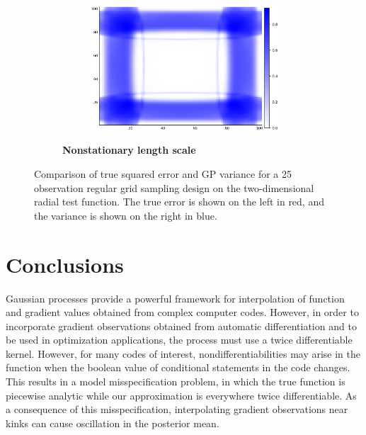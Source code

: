 \documentclass{article}
\begin{document}
\begin{figure}
\begin{subfigure}[b]{.5\textwidth}
\begin{subfigure}[b]{.5\textwidth}
        \includegraphics[scale=0.27]{figures/heatmaps/variance-length-25.png}
      \end{subfigure}
      \caption{\textbf{Nonstationary length scale}}
    \end{subfigure}
		\caption{Comparison of true squared error and GP variance for a 25 observation regular grid sampling design on the two-dimensional radial test function. The true error is shown on the left in red, and the variance is shown on the right in blue.}
		\label{variance}
\end{figure}

\section{Conclusions}
Gaussian processes provide a powerful framework for interpolation of function and gradient values obtained from complex computer codes. However, in order to incorporate gradient observations obtained from automatic differentiation and to be used in optimization applications, the process must use a twice differentiable kernel. However, for many codes of interest, nondifferentiabilities may arise in the function when the boolean value of conditional statements in the code changes. This results in a model misspecification problem, in which the true function is piecewise analytic while our approximation is everywhere twice differentiable. As a consequence of this misspecification, interpolating gradient observations near kinks can cause oscillation in the posterior mean.
\end{document}
